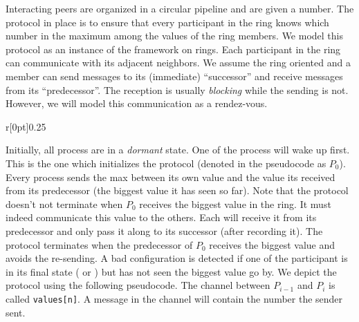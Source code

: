 %
Interacting peers are organized in a circular pipeline and are given a
number. The protocol in place is to ensure that every participant in
the ring knows which number in the maximum among the values of the
ring members. We model this protocol as an instance of the framework
on rings. Each participant in the ring can communicate with its
adjacent neighbors. We assume the ring oriented and a member can send
messages to its (immediate) ``successor'' and receive messages from
its ``predecessor''. The reception is usually \emph{blocking} while
the sending is not. However, we will model this communication as a
rendez-vous.

\noindent%
\begin{wrapfigure}{r}[0pt]{0.25\linewidth}
  \vspace{-24pt}%
  \hfill%
  \vspace{-24pt}%
\end{wrapfigure}
%
Initially, all process are in a \emph{dormant} state. One of the
process will wake up first. This is the one which initializes the
protocol (denoted in the pseudocode as $P_0$). Every process sends the
max between its own value and the value its received from its
predecessor (the biggest value it has seen so far). Note that the
protocol doesn't not terminate when $P_0$ receives the biggest value
in the ring. It must indeed communicate this value to the others. Each
will receive it from its predecessor and only pass it along to its
successor (after recording it). The protocol terminates when the
predecessor of $P_0$ receives the biggest value and avoids the
re-sending. A bad configuration is detected if one of the participant
is in its final state ( or ) but has not seen the
biggest value go by. %
We depict the protocol using the following pseudocode. The channel
between $P_{i-1}$ and $P_i$ is called {\tt values[n]}. A message in
the channel will contain the number the sender sent.


